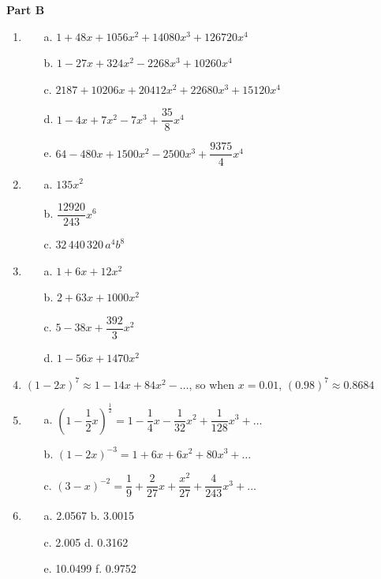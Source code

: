 \noindent\textbf{Part B}
\begin{enumerate}
\item
\begin{enumerate}
  \item[a.] $1 + 48x + 1056x^2 + 14080x^3 + 126720x^4$
  \item[b.] $1 - 27x + 324x^2 - 2268x^3 + 10260x^4$
  \item[c.] $2187 + 10206x + 20412x^2 + 22680x^3 + 15120x^4$
  \item[d.] $1 - 4x + 7x^2 - 7x^3 + \dfrac{35}{8}x^4$
  \item[e.] $64 - 480x + 1500x^2 - 2500x^3 + \dfrac{9375}{4}x^4$
\end{enumerate}

\item
\begin{enumerate}
  \item[a.] $135x^2$
  \item[b.] $\dfrac{12920}{243}x^6$
  \item[c.] $32\,440\,320\,a^4 b^8$
\end{enumerate}

\item
\begin{enumerate}
  \item[a.] $1 + 6x + 12x^2$
  \item[b.] $2 + 63x + 1000x^2$
  \item[c.] $5 - 38x + \dfrac{392}{3}x^2$
  \item[d.] $1 - 56x + 1470x^2$
\end{enumerate}

\item $(1 - 2x)^7 \approx 1 - 14x + 84x^2 - \ldots$, so when $x = 0.01$, $(0.98)^7 \approx 0.8684$

\item
\begin{enumerate}
  \item[a.] $\left(1 - \dfrac{1}{2}x\right)^{\frac{1}{2}} = 1 - \dfrac{1}{4}x - \dfrac{1}{32}x^2 + \dfrac{1}{128}x^3 + \ldots$
  \item[b.] $(1 - 2x)^{-3} = 1 + 6x + 6x^2 + 80x^3 + \ldots$
  \item[c.] $(3 - x)^{-2} = \dfrac{1}{9} + \dfrac{2}{27}x + \dfrac{x^2}{27} + \dfrac{4}{243}x^3 + \ldots$
\end{enumerate}

\item
\begin{enumerate}
  \item[a.] 2.0567 \quad b. 3.0015
  \item[c.] 2.005 \quad d. 0.3162
  \item[e.] 10.0499 \quad f. 0.9752
\end{enumerate}


\end{enumerate}
